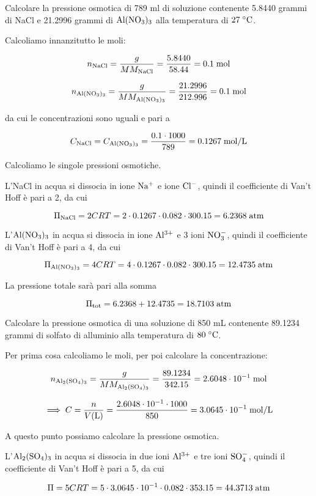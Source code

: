 \begin{esercizio}
    Calcolare la pressione osmotica di 789 ml di soluzione contenente 5.8440 grammi di NaCl e 21.2996 grammi di $\rm Al(NO_3)_3$ alla temperatura di $27 \; \rm ^{\circ}C$.
\end{esercizio}
\begin{soluzione}
    Calcoliamo innanzitutto le moli:

$$n_{\rm NaCl}=\frac{g}{MM_{\rm NaCl}}
=\frac{5.8440}{58.44}=0.1 \; \rm mol$$

$$n_{\rm Al(NO_3)_3}=\frac{g}{MM_{\rm Al(NO_3)_3}}
=\frac{21.2996}{212.996}=0.1 \; \rm mol$$

da cui le concentrazioni sono uguali e pari a

$$C_{\rm NaCl}=C_{\rm Al(NO_3)_3}=\frac{0.1 \cdot 1000}{789}
=0.1267 \; \rm mol/L$$

Calcoliamo le singole pressioni osmotiche.

L'NaCl in acqua si dissocia in ione $\rm Na^+$ e ione $\rm Cl^-$, quindi il coefficiente di Van't Hoff è pari a 2, da cui

$$\Pi_{\rm NaCl}=2CRT=2 \cdot 0.1267 \cdot 0.082 \cdot 300.15=6.2368 \; \rm atm$$

L'$\rm Al(NO_3)_3$ in acqua si dissocia in ione $\rm Al^{3+}$ e 3 ioni $\rm NO_3^-$, quindi il coefficiente di Van't Hoff è pari a 4, da cui

$$\Pi_{\rm Al(NO_3)_3}=4CRT=4 \cdot 0.1267 \cdot 0.082 \cdot 300.15=12.4735 \; \rm atm$$

La pressione totale sarà pari alla somma

$$\Pi_{\rm tot}=6.2368 + 12.4735=18.7103 \; \rm atm$$
\end{soluzione}

\newpage

\begin{esercizio}
    Calcolare la pressione osmotica di una soluzione di 850 mL contenente 89.1234 grammi di solfato di alluminio alla temperatura di $80 \; ^{\circ} \rm C$.
\end{esercizio}
\begin{soluzione}
    Per prima cosa calcoliamo le moli, per poi calcolare la concentrazione:

$$n_{\rm Al_2(SO_4)_3}=\frac{g}{MM_{\rm Al_2(SO_4)_3}}=\frac{89.1234}{342.15}=2.6048 \cdot 10^{-1} \; \rm mol$$

$$\implies C
=\frac{n}{V(\text{L})}
=\frac{2.6048 \cdot 10^{-1} \cdot 1000}{850}
=3.0645 \cdot 10^{-1} \; \rm mol/L$$

A questo punto possiamo calcolare la pressione osmotica.

L'$\rm Al_2(SO_4)_3$ in acqua si dissocia in due ioni $\rm Al^{3+}$ e tre ioni $\rm SO_4^-$, quindi il coefficiente di Van't Hoff è pari a 5, da cui

$$\Pi=5CRT
=5 \cdot 3.0645 \cdot 10^{-1} \cdot 0.082 \cdot 353.15
=44.3713 \; \rm atm$$

\end{soluzione}

